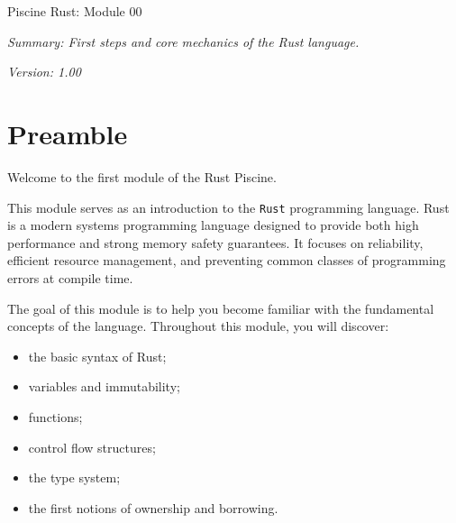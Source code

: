 \documentclass[a4paper,12pt]{report}
\begin{document}
\thispagestyle{empty}

\begin{center}
    \vspace*{2cm}

    \setbigpillar

    \vspace{2cm}

    {\Huge Piscine Rust: Module 00}
  
    \vfill

    \textit{Summary: First steps and core mechanics of the Rust language.}

    \vspace{0.5cm}

    \textit{Version: 1.00}

    \vspace{4cm}
\end{center}

\newpage

\thispagestyle{fancy}
\tableofcontents

\newpage

\chapter{Preamble}

Welcome to the first module of the Rust Piscine.

This module serves as an introduction to the \texttt{Rust} programming language. Rust is a modern systems programming language designed to provide both high performance and strong memory safety guarantees. It focuses on reliability, efficient resource management, and preventing common classes of programming errors at compile time.

The goal of this module is to help you become familiar with the fundamental concepts of the language.\newline
Throughout this module, you will discover:

\begin{itemize}
\item the basic syntax of Rust;
\item variables and immutability;
\item functions;
\item control flow structures;
\item the type system;
\item the first notions of ownership and borrowing.
\end{itemize}
\end{document}
